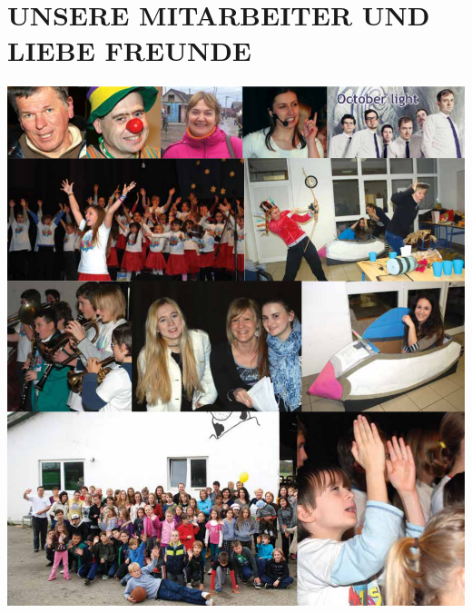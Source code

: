 \documentclass[a4paper,twoside, svgnames]{article}
\begin{document}
\section*{UNSERE MITARBEITER UND LIEBE FREUNDE}
\begin{center}
\vspace{1cm}
\includegraphics[width=1\linewidth]{images/suradnici}\\
\end{center}
\end{document}
